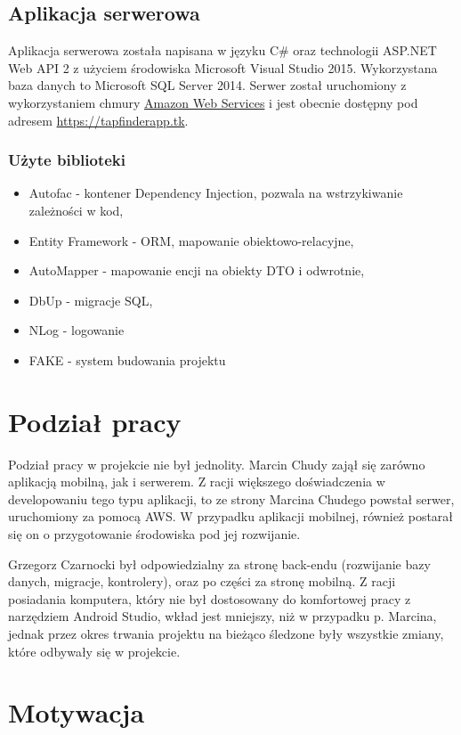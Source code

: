 \documentclass[a4paper]{article}
\begin{document}
\subsection{Aplikacja serwerowa}
Aplikacja serwerowa została napisana w języku C\# oraz technologii ASP.NET Web API 2 z użyciem środowiska Microsoft Visual Studio 2015. Wykorzystana baza danych to Microsoft SQL Server 2014. Serwer został uruchomiony z wykorzystaniem chmury \href{https://aws.amazon.com/?nc2=h_lg}{Amazon Web Services} i jest obecnie dostępny pod adresem \url{https://tapfinderapp.tk}. 

\subsubsection{Użyte biblioteki}
\begin{itemize}
\item Autofac - kontener Dependency Injection, pozwala na wstrzykiwanie zależności w kod, 
\item Entity Framework - ORM, mapowanie obiektowo-relacyjne,
\item AutoMapper - mapowanie encji na obiekty DTO i odwrotnie,
\item DbUp - migracje SQL, 
\item NLog - logowanie
\item FAKE - system budowania projektu
\end{itemize}

\section{Podział pracy}

Podział pracy w projekcie nie był jednolity. Marcin Chudy zajął się zarówno aplikacją mobilną, jak i serwerem. Z racji większego doświadczenia w developowaniu tego typu aplikacji, to ze strony Marcina Chudego powstał serwer, uruchomiony za pomocą AWS. W przypadku aplikacji mobilnej, również postarał się on o przygotowanie środowiska pod jej rozwijanie.

Grzegorz Czarnocki był odpowiedzialny za stronę back-endu (rozwijanie bazy danych, migracje, kontrolery), oraz po części za stronę mobilną. Z racji posiadania komputera, który nie był dostosowany do komfortowej pracy z narzędziem Android Studio, wkład jest mniejszy, niż w przypadku p. Marcina, jednak przez okres trwania projektu na bieżąco śledzone były wszystkie zmiany, które odbywały się w projekcie.

\section{Motywacja}
\end{document}
